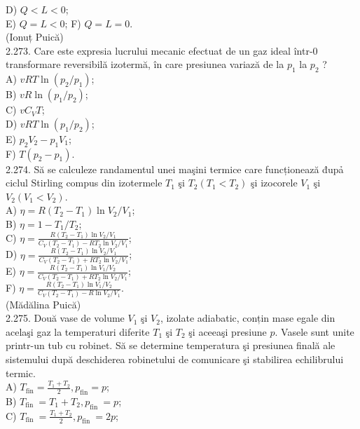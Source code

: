 \documentclass[10pt]{article}
\begin{document}
D) $Q<L<0$;\\
E) $Q=L<0$; F) $Q=L=0$.\\
(Ionuț Puică)\\
2.273. Care este expresia lucrului mecanic efectuat de un gaz ideal într-0 transformare reversibilă izotermă, în care presiunea variază de la $p_{1}$ la $p_{2}$ ?\\
A) $v R T \ln \left(p_{2} / p_{1}\right)$;\\
B) $v R \ln \left(p_{1} / p_{2}\right)$;\\
C) $v C_{V} T$;\\
D) $v R T \ln \left(p_{1} / p_{2}\right)$;\\
E) $p_{2} V_{2}-p_{1} V_{1}$;\\
F) $T\left(p_{2}-p_{1}\right)$.\\
2.274. Să se calculeze randamentul unei maşini termice care funcționează đupả ciclul Stirling compus din izotermele $T_{1}$ şi $T_{2}\left(T_{1}<T_{2}\right)$ şi izocorele $V_{1}$ şi $V_{2}\left(V_{1}<V_{2}\right)$.\\
A) $\eta=R\left(T_{2}-T_{1}\right) \ln V_{2} / V_{1}$;\\
B) $\eta=1-T_{1} / T_{2}$;\\
C) $\eta=\frac{R\left(T_{2}-T_{1}\right) \ln V_{2} / V_{1}}{C_{V}\left(T_{2}-T_{1}\right)-R T_{2} \ln V_{2} / V_{1}}$;\\
D) $\eta=\frac{R\left(T_{2}-T_{1}\right) \ln V_{2} / V_{1}}{C_{V}\left(T_{2}-T_{1}\right)+R T_{2} \ln V_{2} / V_{1}}$;\\
E) $\eta=\frac{R\left(T_{2}-T_{1}\right) \ln V_{1} / V_{2}}{C_{V}\left(T_{2}-T_{1}\right)+R T_{2} \ln V_{2} / V_{1}}$;\\
F) $\eta=\frac{R\left(T_{2}-T_{1}\right) \ln V_{1} / V_{2}}{C_{V}\left(T_{2}-T_{1}\right)-R \ln V_{2} / V_{1}}$.\\
(Mădălina Puică)\\
2.275. Două vase de volume $V_{1}$ şi $V_{2}$, izolate adiabatic, conțin mase egale din acelaşi gaz la temperaturi diferite $T_{1}$ şi $T_{2}$ şi aceeaşi presiune $p$. Vasele sunt unite printr-un tub cu robinet. Să se determine temperatura şi presiunea finală ale sistemului după deschiderea robinetului de comunicare şi stabilirea echilibrului termic.\\
A) $T_{\mathrm{fin}}=\frac{T_{1}+T_{2}}{2}, p_{\mathrm{fin}}=p$;\\
B) $T_{\text {fin }}=T_{1}+T_{2}, p_{\text {fin }}=p$;\\
C) $T_{\text {fin }}=\frac{T_{1}+T_{2}}{2}, p_{\text {fin }}=2 p$;\\
\end{document}
